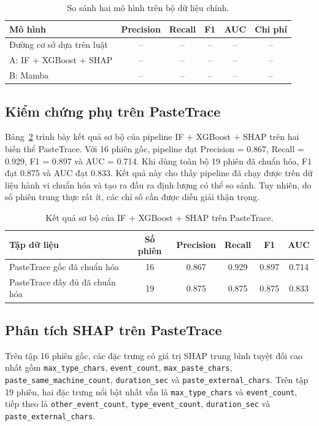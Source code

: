 \documentclass[runningheads]{llncs}
\begin{document}
\begin{table}[t]
\caption{So sánh hai mô hình trên bộ dữ liệu chính.}
\label{tab:main}
\centering
\begin{tabular}{lccccc}
\toprule
Mô hình & Precision & Recall & F1 & AUC & Chi phí \\
\midrule
Đường cơ sở dựa trên luật & -- & -- & -- & -- & -- \\
A: IF + XGBoost + SHAP & -- & -- & -- & -- & -- \\
B: Mamba & -- & -- & -- & -- & -- \\
\bottomrule
\end{tabular}
\end{table}

\subsection{Kiểm chứng phụ trên PasteTrace}
Bảng~\ref{tab:pastetrace} trình bày kết quả sơ bộ của pipeline IF + XGBoost +
SHAP trên hai biến thể PasteTrace. Với 16 phiên gốc, pipeline đạt Precision =
0.867, Recall = 0.929, F1 = 0.897 và AUC = 0.714. Khi dùng toàn bộ 19 phiên đã
chuẩn hóa, F1 đạt 0.875 và AUC đạt 0.833. Kết quả này cho thấy pipeline đã chạy
được trên dữ liệu hành vi chuẩn hóa và tạo ra đầu ra định lượng có thể so sánh.
Tuy nhiên, do số phiên trung thực rất ít, các chỉ số cần được diễn giải thận
trọng.

\begin{table}[t]
\caption{Kết quả sơ bộ của IF + XGBoost + SHAP trên PasteTrace.}
\label{tab:pastetrace}
\centering
\begin{tabular}{lccccc}
\toprule
Tập dữ liệu & Số phiên & Precision & Recall & F1 & AUC \\
\midrule
PasteTrace gốc đã chuẩn hóa & 16 & 0.867 & 0.929 & 0.897 & 0.714 \\
PasteTrace đầy đủ đã chuẩn hóa & 19 & 0.875 & 0.875 & 0.875 & 0.833 \\
\bottomrule
\end{tabular}
\end{table}

\subsection{Phân tích SHAP trên PasteTrace}
Trên tập 16 phiên gốc, các đặc trưng có giá trị SHAP trung bình tuyệt đối cao
nhất gồm \texttt{max\_type\_chars}, \texttt{event\_count},
\texttt{max\_paste\_chars}, \texttt{paste\_same\_machine\_count},
\texttt{duration\_sec} và \texttt{paste\_external\_chars}. Trên tập 19 phiên,
hai đặc trưng nổi bật nhất vẫn là \texttt{max\_type\_chars} và
\texttt{event\_count}, tiếp theo là \texttt{other\_event\_count},
\texttt{type\_event\_count}, \texttt{duration\_sec} và
\texttt{paste\_external\_chars}.
\end{document}

